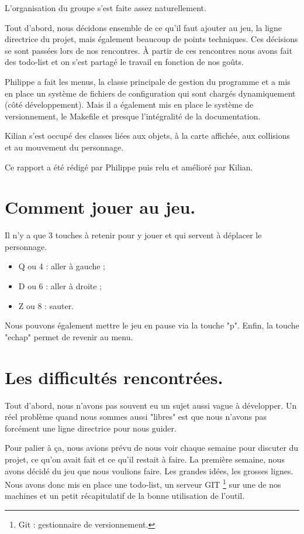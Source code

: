 L'organisation du groupe s'est faite assez naturellement.

Tout d'abord, nous décidons ensemble de ce qu'il faut ajouter au jeu, 
la ligne directrice du projet, mais également beaucoup de points techniques.
Ces décisions se sont passées lors de nos rencontres.
À partir de ces rencontres nous avons fait des todo-list et on s'est partagé le travail en fonction de nos goûts.

Philippe a fait les menus, la classe principale de gestion du programme et a mis en place un système de fichiers de configuration qui sont chargés dynamiquement (côté développement).
Mais il a également mis en place le système de versionnement, le Makefile et presque l'intégralité de la documentation.

Kilian s'est occupé des classes liées aux objets, à la carte affichée, aux collisions et au mouvement du personnage.

Ce rapport a été rédigé par Philippe puis relu et amélioré par Kilian.

\section{Comment jouer au jeu.}

Il n'y a que 3 touches à retenir pour y jouer et qui servent à déplacer le personnage.

\begin{itemize}
	\item Q ou 4 : aller à gauche ;
	\item D ou 6 : aller à droite ;
	\item Z ou 8 : sauter.
\end{itemize}

Nous pouvons également mettre le jeu en pause via la touche "p".
Enfin, la touche "echap" permet de revenir au menu.

\section{Les difficultés rencontrées.}

Tout d'abord, nous n'avons pas souvent eu un sujet aussi vague à développer.
Un réel problème quand nous sommes aussi "libres" est que nous n'avons pas forcément une ligne directrice pour nous guider.

Pour palier à ça, nous avions prévu de nous voir chaque semaine pour discuter du projet, ce qu'on avait fait et ce qu'il restait à faire.
La première semaine, nous avons décidé du jeu que nous voulions faire.
Les grandes idées, les grosses lignes.
Nous avons donc mis en place une todo-list, un serveur \cite{GIT} GIT \protect\footnote{Git : gestionnaire de versionnement. } sur une de nos machines et un petit récapitulatif de la bonne utilisation de l'outil.

